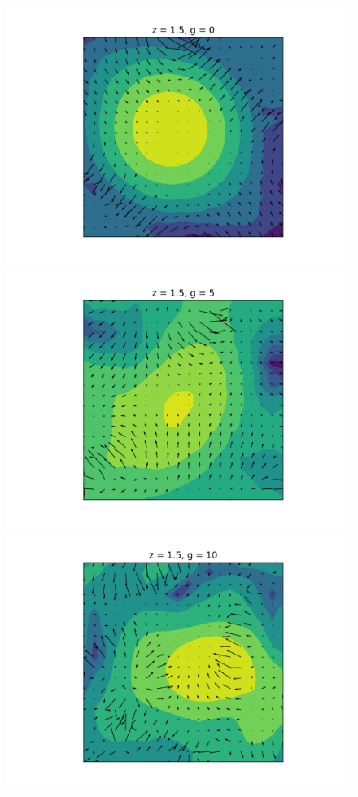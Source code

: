 \documentclass[a4paper,11pt]{article}
\begin{document}
\begin{figure}[!htb]
  \includegraphics[trim={4cm 0 1cm 0cm},scale=0.5]{small_vel_1_5_g0.png}
\endminipage\hfill
{}
  \includegraphics[trim={4cm 0 1cm 0cm},scale=0.5]{small_vel_1_5_g5.png}
\endminipage\hfill
{}
  \includegraphics[trim={4cm 0 0cm 0cm},scale=0.5]{small_vel_1_5_g10.png}
\endminipage\hfill


\end{figure}
\end{document}

